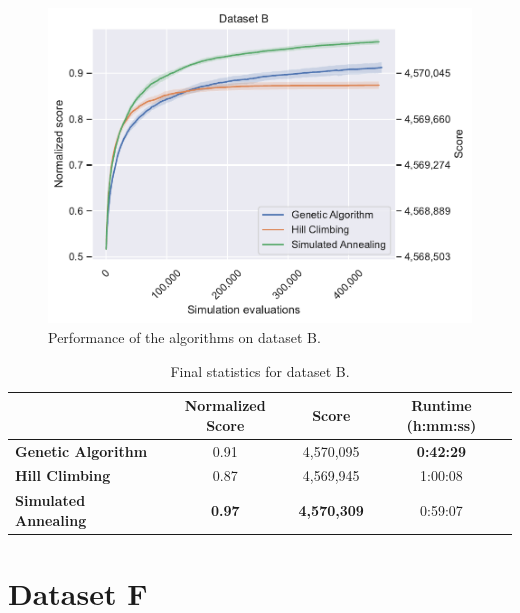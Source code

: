 \begin{figure}[h]
    \centering
    \includegraphics[width=\linewidth]{img/experiments/b_Genetic Algorithm_Hill Climbing_Simulated Annealing.pdf}
    \caption[Performance of the algorithms on dataset B]{
        Performance of the algorithms on dataset B.
    }
    \label{fig:dataset_b_experiment}
\end{figure}

\bigskip

\begin{table}[h]
\centering\footnotesize\sf
\begin{tabular}{lccc}
\toprule
& Normalized Score & Score & Runtime (h:mm:ss) \\
\midrule
\textcolor{myblue}{\textbf{Genetic Algorithm}} & 0.91 & 4,570,095 & \textbf{0:42:29} \\
\textcolor{myorange}{\textbf{Hill Climbing}} & 0.87 & 4,569,945 & 1:00:08 \\
\textcolor{mygreen}{\textbf{Simulated Annealing}} & \textbf{0.97} & \textbf{4,570,309} & 0:59:07 \\
\bottomrule
\end{tabular}
\caption[Statistics for dataset B]{
    Final statistics for dataset B.
}
\label{tab:dataset_b_results}
\end{table}

\newpage
\section{Dataset F} \label{sec:dataset_f}

